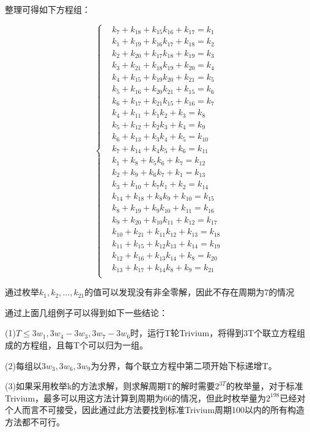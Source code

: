整理可得如下方程组：

\begin{equation}
\left\{
\begin{aligned}
&k_{7}+k_{18}+k_{15}k_{16}+k_{17}=k_{1}\\
&k_{1}+k_{19}+k_{16}k_{17}+k_{18}=k_{2}\\
&k_{2}+k_{20}+k_{17}k_{18}+k_{19}=k_{3}\\
&k_{3}+k_{21}+k_{18}k_{19}+k_{20}=k_{4}\\
&k_{4}+k_{15}+k_{19}k_{20}+k_{21}=k_{5}\\
&k_{5}+k_{16}+k_{20}k_{21}+k_{15}=k_{6}\\
&k_{6}+k_{17}+k_{21}k_{15}+k_{16}=k_{7}\\
&k_{4}+k_{11}+k_{1}k_{2}+k_{3}=k_{8}\\
&k_{5}+k_{12}+k_{2}k_{3}+k_{4}=k_{9}\\
&k_{6}+k_{13}+k_{3}k_{4}+k_{5}=k_{10}\\
&k_{7}+k_{14}+k_{4}k_{5}+k_{6}=k_{11}\\
&k_{1}+k_{8}+k_{5}k_{6}+k_{7}=k_{12}\\
&k_{2}+k_{9}+k_{6}k_{7}+k_{1}=k_{13}\\
&k_{3}+k_{10}+k_{7}k_{1}+k_{2}=k_{14}\\
&k_{14}+k_{18}+k_{8}k_{9}+k_{10}=k_{15}\\
&k_{8}+k_{19}+k_{9}k_{10}+k_{11}=k_{16}\\
&k_{9}+k_{20}+k_{10}k_{11}+k_{12}=k_{17}\\
&k_{10}+k_{21}+k_{11}k_{12}+k_{13}=k_{18}\\
&k_{11}+k_{15}+k_{12}k_{13}+k_{14}=k_{19}\\
&k_{12}+k_{16}+k_{13}k_{14}+k_{8}=k_{20}\\
&k_{13}+k_{17}+k_{14}k_{8}+k_{9}=k_{21}\\
\end{aligned}
\right.
\end{equation}

通过枚举$k_{1}, k_{2}, \ldots, k_{21}$的值可以发现没有非全零解，因此不存在周期为7的情况

\vspace{3ex}

通过上面几组例子可以得到如下一些结论：

(1)$T \leq 3w_{1},3w_{4}-3w_{3},3w_{7}-3w_{6}$时，运行T轮Trivium，将得到3T个联立方程组成的方程组，且每T个可以归为一组。

(2)每组以$3w_{3},3w_{6},3w_{9}$为分界，每个联立方程中第二项开始下标递增T。

(3)如果采用枚举k的方法求解，则求解周期T的解时需要$2^{3T}$的枚举量，对于标准Trivium，最多可以用这方法计算到周期为66的情况，但此时枚举量为$2^{198}$已经对个人而言不可接受，因此通过此方法要找到标准Trivium周期100以内的所有构造方法都不可行。